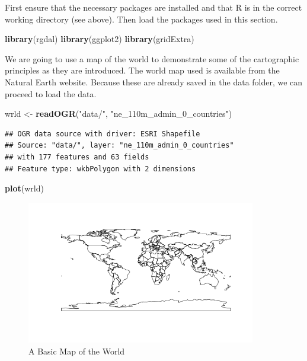 \documentclass[]{article}
\newenvironment{Shaded}{}{}
\newcommand{\KeywordTok}[1]{\textcolor[rgb]{0.00,0.44,0.13}{\textbf{{#1}}}}
\newcommand{\StringTok}[1]{\textcolor[rgb]{0.25,0.44,0.63}{{#1}}}
\newcommand{\NormalTok}[1]{{#1}}
\let\Oldincludegraphics\includegraphics
\renewcommand{\includegraphics}[1]{\Oldincludegraphics[width=10cm]{#1}}
\begin{document}
First ensure that the necessary packages are installed and that R is in
the correct working directory (see above). Then load the packages used
in this section.

\begin{Shaded}
\begin{Highlighting}[]
\KeywordTok{library}\NormalTok{(rgdal)}
\KeywordTok{library}\NormalTok{(ggplot2)}
\KeywordTok{library}\NormalTok{(gridExtra)}
\end{Highlighting}
\end{Shaded}
We are going to use a map of the world to demonstrate some of the
cartographic principles as they are introduced. The world map used is
available from the Natural Earth website. Because these are already
saved in the data folder, we can proceed to load the data.

\begin{Shaded}
\begin{Highlighting}[]
\NormalTok{wrld <- }\KeywordTok{readOGR}\NormalTok{(}\StringTok{"data/"}\NormalTok{, }\StringTok{"ne_110m_admin_0_countries"}\NormalTok{)}
\end{Highlighting}
\end{Shaded}
\begin{verbatim}
## OGR data source with driver: ESRI Shapefile 
## Source: "data/", layer: "ne_110m_admin_0_countries"
## with 177 features and 63 fields
## Feature type: wkbPolygon with 2 dimensions
\end{verbatim}
\begin{Shaded}
\begin{Highlighting}[]
\KeywordTok{plot}\NormalTok{(wrld)}
\end{Highlighting}
\end{Shaded}
\begin{figure}[htbp]
\centering
\includegraphics{figure/A_Basic_Map_of_the_World.png}
\caption{A Basic Map of the World}
\end{figure}
\end{document}
